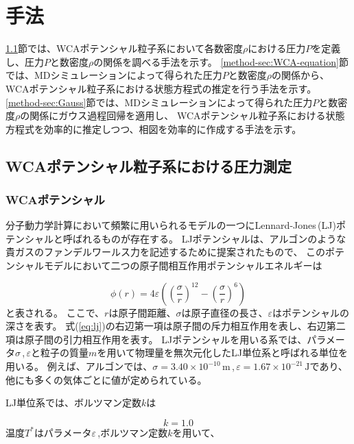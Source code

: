 \documentclass[titlepage]{jsreport}
\begin{document}
\chapter{手法} \label{chap:method}
\ref{method-sec:WCA-press}節では、WCAポテンシャル粒子系において各数密度$\rho$における圧力$P$を定義し、圧力$P$と数密度$\rho$の関係を調べる手法を示す。
\ref{method-sec:WCA-equation}節では、MDシミュレーションによって得られた圧力$P$と数密度$\rho$の関係から、WCAポテンシャル粒子系における状態方程式の推定を行う手法を示す。
\ref{method-sec:Gauss}節では、MDシミュレーションによって得られた圧力$P$と数密度$\rho$の関係にガウス過程回帰を適用し、
WCAポテンシャル粒子系における状態方程式を効率的に推定しつつ、相図を効率的に作成する手法を示す。



\section{WCAポテンシャル粒子系における圧力測定}\label{method-sec:WCA-press}


\subsection{WCAポテンシャル}\label{method-subsec:WCA}
分子動力学計算において頻繁に用いられるモデルの一つにLennard-Jones\,(LJ)ポテンシャルと呼ばれるものが存在する。
LJポテンシャルは、アルゴンのような貴ガスのファンデルワールス力を記述するために提案\cite{Lennard_Jones_1931}されたもので、
このポテンシャルモデルにおいて二つの原子間相互作用ポテンシャルエネルギーは

\large
\begin{equation}
\phi(r)=4{\varepsilon}\left(\left(\frac{\sigma}{r}\right)^{12}-\left(\frac{\sigma}{r}\right)^6\right)\label{eq:lj}
\end{equation}
\normalsize
と表される。
ここで、$r$は原子間距離、${\sigma}$は原子直径の長さ、${\varepsilon}$はポテンシャルの深さを表す。
式(\ref{eq:lj})の右辺第一項は原子間の斥力相互作用を表し、右辺第二項は原子間の引力相互作用を表す。
LJポテンシャルを用いる系では、パラメータ$\sigma$\,,\,$\varepsilon$と粒子の質量$m$を用いて物理量を無次元化したLJ単位系と呼ばれる単位を用いる。
例えば、アルゴンでは、${\sigma}=3.40×10^{-10}\,\mathrm{m}$\,,\,${\varepsilon}=1.67×10^{-21}\,\mathrm{J}$であり\cite{argon-parameters}、
他にも多くの気体ごとに値が定められている\cite{graphane-parameters,many-parameters}。

\newpage
LJ単位系では、ボルツマン定数$k$は

\large
\begin{equation}
k=1.0\label{eq:k}
\end{equation}
\normalsize
温度$T^*$はパラメータ$\varepsilon$\,,ボルツマン定数$k$を用いて、
\end{document}

